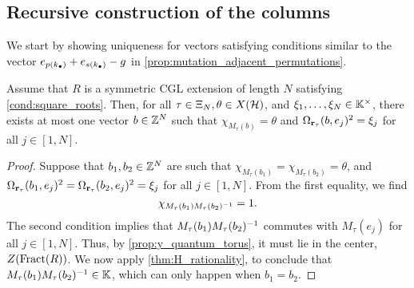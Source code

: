 \subsection{Recursive construction of the columns}

We start by showing uniqueness for vectors satisfying conditions similar to the vector
$e_{p(k_\bullet)} + e_{s(k_\bullet)} - g$ in \cref{prop:mutation_adjacent_permutations}.

\begin{lemma}\label{lem:unique_b}
	Assume that $R$ is a symmetric CGL extension of length $N$ satisfying \cref{cond:square_roots}. Then, for all $\tau \in \Xi_N, \theta \in X(\mathcal{H})$, and $\xi_1, \dots, \xi_N \in \mathbb{K}^\times$, there exists at most one vector $b\in \mathbb{Z}^N$ such that $\chi_{M_\tau(b)} = \theta$ and $\Omega_{\mathbf{r}_\tau}(b, e_j)^2 = \xi_j$ for all $j \in [1, N]$.
\end{lemma}
\begin{proof}
	Suppose that $b_1, b_2 \in \mathbb{Z}^N$ are such that $\chi_{M_\tau(b_1)} = \chi_{M_\tau(b_2)} = \theta$, and $\Omega_{\mathbf{r}_\tau}(b_1, e_j)^2 = \Omega_{\mathbf{r}_\tau}(b_2, e_j)^2 = \xi_j$ for all $j \in [1, N]$. From the first equality, we find
	\begin{equation*}
		\chi_{M_\tau(b_1)M_\tau(b_2)^{-1}} = 1.
	\end{equation*}
	The second condition implies that $M_\tau(b_1)M_\tau(b_2)^{-1}$ commutes with
	$M_\tau(e_j)$ for all $j\in [1, N]$. Thus, by \cref{prop:y_quantum_torus}, it must lie
	in the center, $Z(\operatorname{Fract}(R))$. We now apply \cref{thm:H_rationality}, to conclude that
	$M_\tau(b_1)M_\tau(b_2)^{-1} \in \mathbb{K}$, which can only happen when $b_1 = b_2$.
\end{proof}

